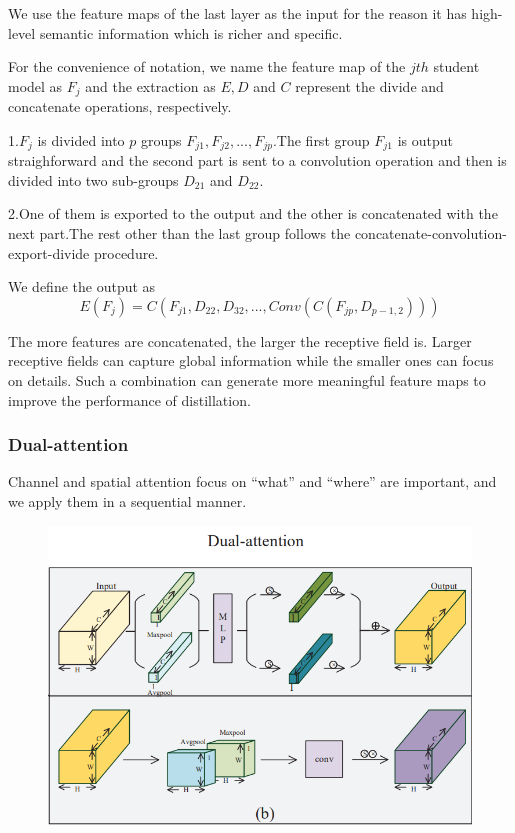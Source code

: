 \documentclass[11pt]{article}
\begin{document}
We use the feature maps of the last layer as the input for the reason it has high-level semantic information which is richer and specific.

For the convenience of notation, we name the feature map of the $jth$ student model as $F_j$ and the extraction as $E,D$ and $C$ represent the divide and concatenate
operations, respectively. 

1.$F_j$ is divided into $p$ groups ${F_{j1},F_{j2},...,F_{jp}}$.The first group $F_{j1}$ is output straighforward and the second part is sent to a convolution operation and then is divided into two sub-groups $D_{21}$ and $D_{22}$.

2.One of them is exported to the output and the other is concatenated with the next part.The rest other than the last group follows the concatenate-convolution-export-divide procedure.

We define the output as 
$$E(F_j) = C(F_{j1},D_{22},D_{32},..., Conv(C(F_{jp},D_{p-1,2})))$$

The more features are concatenated, the larger the receptive field is. Larger receptive fields can capture global information while the smaller ones can focus on details. Such a combination can generate more meaningful feature maps to improve the performance of distillation.

\subsubsection{Dual-attention}
Channel and spatial attention focus on “what” and “where” are important, and we apply them in a sequential manner.
\begin{figure}[H]
	\centering
	\includegraphics[scale = 0.5]{106}
\end{figure}
\end{document}
